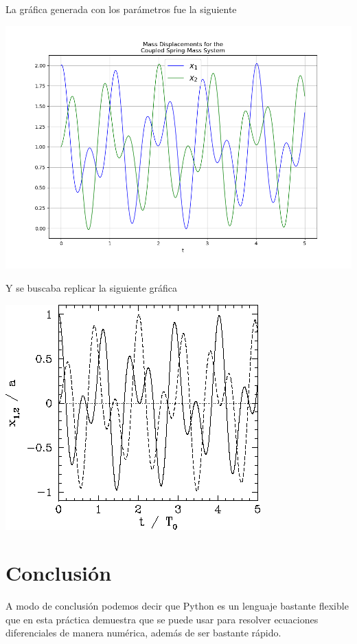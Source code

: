 \documentclass{article}
\begin{document}
La gráfica generada con los parámetros fue la siguiente
\begin{center}
    \includegraphics[scale = 0.4]{two_springs.png}
\end{center}
Y se buscaba replicar la siguiente gráfica
\begin{center}
    \includegraphics[scale = 0.5]{two_springs_original.png}
\end{center}

\section{Conclusión}
A modo de conclusión podemos decir que Python es un lenguaje bastante flexible que en esta práctica demuestra que se puede usar para resolver ecuaciones diferenciales de manera numérica, además de ser bastante rápido.
\end{document}
